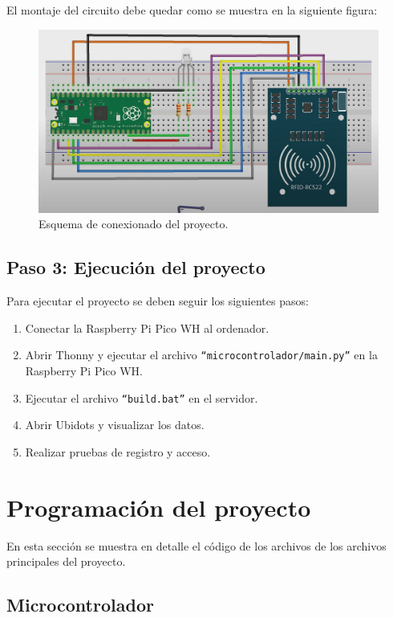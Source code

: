 \documentclass{article}
\begin{document}
El montaje del circuito debe quedar como se muestra en la siguiente figura:
\begin{figure}[H]
	\centering
	\includegraphics[width=1\linewidth]{../images/esquema_de_conexionado.png}
	\caption{\label{fig:circuito}Esquema de conexionado del proyecto.}
\end{figure}

\subsection{Paso 3: Ejecución del proyecto}
Para ejecutar el proyecto se deben seguir los siguientes pasos:
\begin{enumerate}
	\item Conectar la Raspberry Pi Pico WH al ordenador.
	\item Abrir Thonny y ejecutar el archivo \texttt{``microcontrolador/main.py''} en la Raspberry Pi Pico WH.
	\item Ejecutar el archivo \texttt{``build.bat''} en el servidor.
	\item Abrir Ubidots y visualizar los datos.
	\item Realizar pruebas de registro y acceso.
\end{enumerate}

\section{Programación del proyecto}
En esta sección se muestra en detalle el código de los archivos de los archivos principales del proyecto.

\subsection{Microcontrolador}
\end{document}
